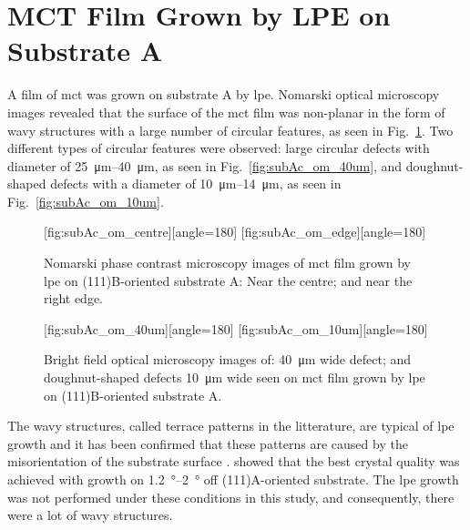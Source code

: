 \clearpage
\section{MCT Film Grown by LPE on Substrate A}\label{sec:subAc}

A film of \acl{mct} was grown on substrate A by \ac{lpe}. Nomarski optical microscopy images revealed that the surface of the \ac{mct} film was non-planar in the form of wavy structures with a large number of circular features, as seen in Fig.~\ref{fig:subAc_om}. Two different types of circular features were observed: large circular defects with diameter of \SIrange{25}{40}{\micro\metre}, as seen in Fig.~\ref{fig:subAc_om_40um}, and doughnut-shaped defects with a diameter of \SIrange{10}{14}{\micro\metre}, as seen in Fig.~\ref{fig:subAc_om_10um}. %

\begin{figure}[htbp]
    \centering
    [fig:subAc_om_centre][angle=180]
    \hfill
    [fig:subAc_om_edge][angle=180]
    \caption[Nomarski phase contrast microscopy images of \ac{mct} film grown by \ac{lpe} on substrate A.]{Nomarski phase contrast microscopy images of \ac{mct} film grown by \ac{lpe} on (111)B-oriented substrate A:  Near the centre; and  near the right edge.}
    \label{fig:subAc_om}
\end{figure}

\begin{figure}[htbp]
    \centering
    [fig:subAc_om_40um][angle=180]
    \hfill
    [fig:subAc_om_10um][angle=180]
    \caption[Bright field optical microscopy images of defects seen on \ac{mct} film grown by \ac{lpe} on substrate A.]{Bright field optical microscopy images of:  \SI{40}{\micro\metre} wide defect; and  doughnut-shaped defects \SI{10}{\micro\metre} wide seen on \ac{mct} film grown by \ac{lpe} on (111)B-oriented substrate A.}
    \label{fig:subAc_om_40umand10um}
\end{figure}

The wavy structures, called terrace patterns in the litterature, are typical of \ac{lpe} growth and it has been confirmed that these patterns are caused by the misorientation of the substrate surface \citep{benz1980crystals, parker1988terracing}. \citet{li1998crystallinity} showed that the best crystal quality was achieved with growth on \SIrange{1.2}{2}{\degree} off (111)A-oriented substrate. The \ac{lpe} growth was not performed under these conditions in this study, and consequently, there were a lot of wavy structures.

